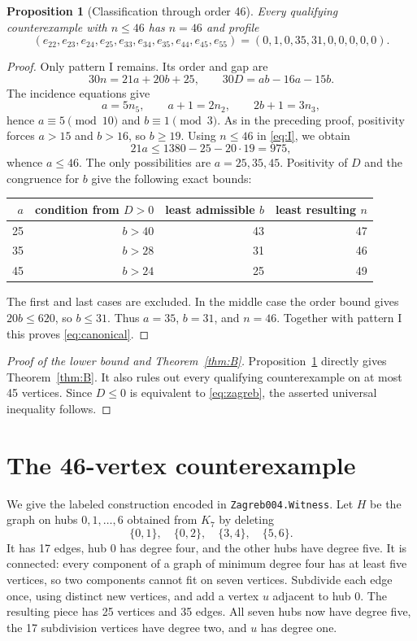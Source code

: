 \documentclass[11pt]{amsart}
\newtheorem{proposition}[theorem]{Proposition}
\theoremstyle{definition}
\theoremstyle{remark}
\begin{document}
\begin{proposition}[Classification through order 46]\label{prop:classification}
Every qualifying counterexample with $n\le46$ has $n=46$ and profile
\begin{equation}\label{eq:canonical}
 (e_{22},e_{23},e_{24},e_{25},e_{33},e_{34},e_{35},e_{44},e_{45},e_{55})
 =(0,1,0,35,31,0,0,0,0,0).
\end{equation}
\end{proposition}
\begin{proof}
Only pattern I remains. Its order and gap are
\begin{equation}\label{eq:I}
 30n=21a+20b+25,\qquad 30D=ab-16a-15b.
\end{equation}
The incidence equations give
\[
 a=5n_5,\qquad a+1=2n_2,\qquad 2b+1=3n_3,
\]
hence $a\equiv5\pmod{10}$ and $b\equiv1\pmod3$. As in the preceding proof, positivity forces $a>15$ and $b>16$, so $b\ge19$. Using $n\le46$ in \eqref{eq:I}, we obtain
\[
 21a\le1380-25-20\cdot19=975,
\]
whence $a\le46$. The only possibilities are $a=25,35,45$. Positivity of $D$ and the congruence for $b$ give the following exact bounds:
\begin{center}
\begin{tabular}{rrrr}
\toprule
$a$ & condition from $D>0$ & least admissible $b$ & least resulting $n$\\
\midrule
25 & $b>40$ &43&47\\
35 & $b>28$ &31&46\\
45 & $b>24$ &25&49\\
\bottomrule
\end{tabular}
\end{center}
The first and last cases are excluded. In the middle case the order bound gives $20b\le620$, so $b\le31$. Thus $a=35$, $b=31$, and $n=46$. Together with pattern I this proves \eqref{eq:canonical}.
\end{proof}

\begin{proof}[Proof of the lower bound and Theorem~\ref{thm:B}]
Proposition~\ref{prop:classification} directly gives Theorem~\ref{thm:B}. It also rules out every qualifying counterexample on at most 45 vertices. Since $D\le0$ is equivalent to \eqref{eq:zagreb}, the asserted universal inequality follows.
\end{proof}

\section{The 46-vertex counterexample}\label{sec:witness}
We give the labeled construction encoded in \texttt{Zagreb004.Witness}.
Let $H$ be the graph on hubs $0,1,\ldots,6$ obtained from $K_7$ by deleting
\[
 \{0,1\},\quad\{0,2\},\quad\{3,4\},\quad\{5,6\}.
\]
It has 17 edges, hub 0 has degree four, and the other hubs have degree five. It is connected: every component of a graph of minimum degree four has at least five vertices, so two components cannot fit on seven vertices.
Subdivide each edge once, using distinct new vertices, and add a vertex $u$ adjacent to hub 0. The resulting piece has 25 vertices and 35 edges. All seven hubs now have degree five, the 17 subdivision vertices have degree two, and $u$ has degree one.
\end{document}
